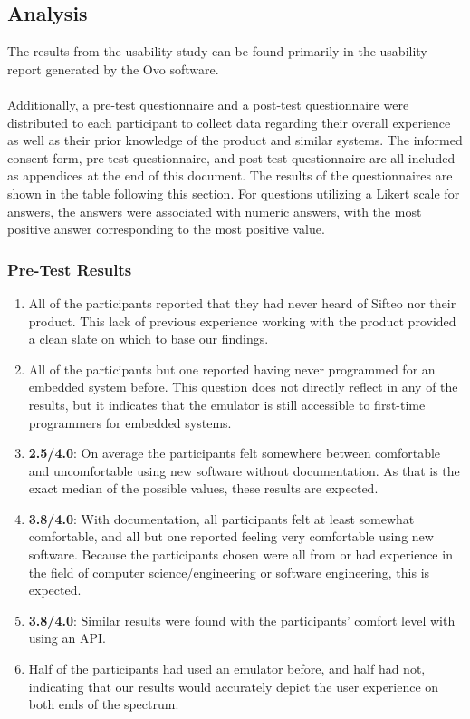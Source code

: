 \documentclass[12pt]{article}
\begin{document}
\subsection{Analysis}
The results from the usability study can be found primarily in the usability report generated by the Ovo software. \\\\
Additionally, a pre-test questionnaire and a post-test questionnaire were distributed to each participant to collect data regarding their overall experience as well as their prior knowledge of the product and similar systems. The informed consent form, pre-test questionnaire, and post-test questionnaire are all included as appendices at the end of this document. The results of the questionnaires are shown in the table following this section. For questions utilizing a Likert scale for answers, the answers were associated with numeric answers, with the most positive answer corresponding to the most positive value.

\subsubsection{Pre-Test Results}
\begin{enumerate}
        \item{All of the participants reported that they had never heard of Sifteo nor their product. This lack of previous experience working with the product provided a clean slate on which to base our findings.}
        \item{All of the participants but one reported having never programmed for an embedded system before. This question does not directly reflect in any of the results, but it indicates that the emulator is still accessible to first-time programmers for embedded systems.}
        \item{\textbf{2.5/4.0}: On average the participants felt somewhere between comfortable and uncomfortable using new software without documentation.  As  that is the exact median of the possible values, these results are expected.}
        \item{\textbf{3.8/4.0}: With documentation, all participants felt at least somewhat comfortable, and all but one reported feeling very comfortable using new software. Because the participants chosen were all from or had experience in the field of computer science/engineering or software engineering, this is expected.}
        \item{\textbf{3.8/4.0}: Similar results were found with the participants' comfort level with using an API.}
        \item{Half of the participants had used an emulator before, and half had not, indicating that our results would accurately depict the user experience on both ends of the spectrum.}
\end{enumerate}
\end{document}
